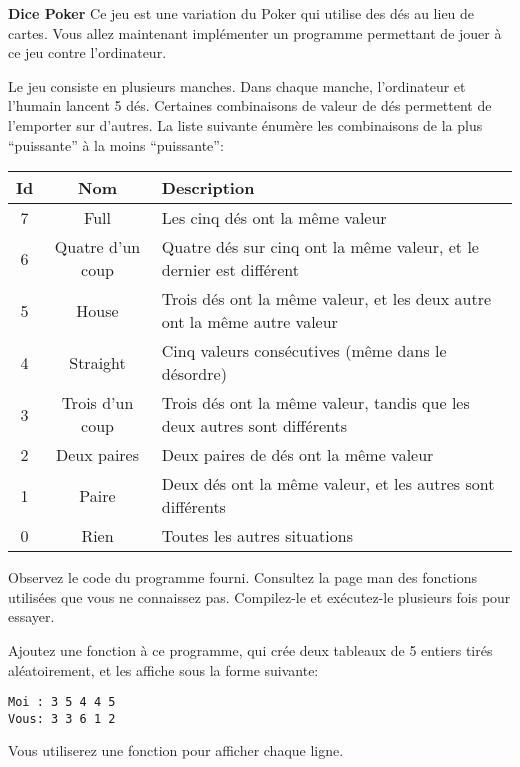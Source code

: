 \documentclass[10pt]{article}\usepackage[nu]{esial}
\begin{document}
\begin{Exercice}\textbf{Dice Poker}
  Ce jeu est une variation du Poker qui utilise des dés au lieu de cartes. Vous
  allez maintenant implémenter un programme permettant de jouer à ce jeu contre
  l'ordinateur.

  Le jeu consiste en plusieurs manches. Dans chaque manche, l'ordinateur et
  l'humain lancent 5 dés. Certaines combinaisons de valeur de dés permettent de
  l'emporter sur d'autres. La liste suivante énumère les combinaisons de la
  plus ``puissante'' à la moins ``puissante'':
  \begin{tabular}{|c|c|l|}\hline
    \textbf{Id}&\textbf{Nom}&\textbf{Description}\\\hline
    7&Full& Les cinq dés ont la même valeur\\\hline
    6&Quatre d'un coup& Quatre dés sur cinq ont la même valeur, et le dernier
                        est différent\\\hline
    5&House&Trois dés ont la même valeur, et les deux
            autre ont la même autre valeur\\\hline
    4&Straight& Cinq valeurs consécutives (même dans le
                désordre)\\\hline
    3&Trois d'un coup&Trois dés ont la même valeur, tandis que les
                      deux autres sont différents\\\hline
    2&Deux paires&Deux paires de dés ont la même valeur\\\hline
    1&Paire&Deux dés ont la même valeur, et les autres sont
            différents\\\hline
    0&Rien&Toutes les autres situations\\\hline
  \end{tabular}
  
  \Question Observez le code du programme  fourni.
  Consultez la page man des fonctions utilisées que vous ne connaissez
  pas. Compilez-le et exécutez-le plusieurs fois pour essayer.

  \noindent\begin{minipage}{.77\linewidth}
    \Question Ajoutez une fonction  à ce programme, qui crée
    deux tableaux de 5 entiers tirés aléatoirement, et les affiche sous la
    forme suivante:
  \end{minipage}\hfill\begin{minipage}{.19\linewidth}
    \begin{Verbatim}
Moi : 3 5 4 4 5
Vous: 3 3 6 1 2
    \end{Verbatim}
  \end{minipage}
  Vous utiliserez une fonction  pour
  afficher chaque ligne.


\end{Exercice}
\end{document}
